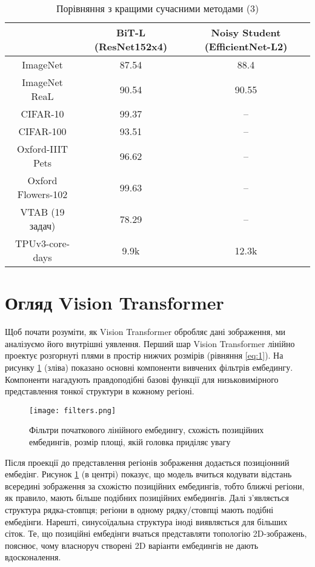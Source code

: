\begin{table}[H]
    \caption{Порівняння з кращими сучасними методами (3)}
    \begin{tabular}{ c c c }
        \hline
         & BiT-L (ResNet152x4) & Noisy Student (EfficientNet-L2)  \\ \hline
        ImageNet           & 87.54 & 88.4  \\ 
        ImageNet ReaL      & 90.54 & 90.55  \\ 
        CIFAR-10           & 99.37 & --  \\ 
        CIFAR-100          & 93.51 & --  \\ 
        Oxford-IIIT Pets   & 96.62 & --  \\ 
        Oxford Flowers-102 & 99.63 & --  \\ 
        VTAB (19 задач)    & 78.29 & --  \\ \hline
        TPUv3-core-days    & 9.9k  & 12.3k  \\ \hline
    \end{tabular}
    \label{tab:t4}
\end{table}

\section{Огляд Vision Transformer}
Щоб почати розуміти, як Vision Transformer обробляє дані
зображення, ми аналізуємо його внутрішні уявлення. Перший шар
Vision Transformer лінійно проектує розгорнуті плями в простір
нижчих розмірів (рівняння \ref{eq:1}).
На рисунку \ref{fig:filters} (зліва) показано основні
компоненти вивчених фільтрів ембедингу.
Компоненти нагадують правдоподібні базові функції
для низьковимірного представлення тонкої структури в кожному
регіоні.

\begin{figure}[H]
    \centering
    \texttt{[image: filters.png]}
    \caption{Фільтри початкового лінійного ембедингу, схожість позиційних ембедингів, розмір площі, якій головка приділяє увагу}
    \label{fig:filters}
\end{figure}

Після проекції до представлення регіонів зображення додається
позиціонний ембедінг. Рисунок \ref{fig:filters} (в центрі) показує,
що модель вчиться кодувати відстань всередині зображення за схожістю
позиційних ембедингів, тобто ближчі регіони, як правило, мають більше
подібних позиційних ембедингів. Далі з'являється структура рядка-стовпця;
регіони в одному рядку/стовпці мають подібні ембедінги.
Нарешті, синусоїдальна структура іноді виявляється для більших сіток.
Те, що позиційні ембедінги вчаться представляти
топологію 2D-зображень, пояснює, чому власноруч
створені 2D варіанти ембедингів не дають
вдосконалення.

